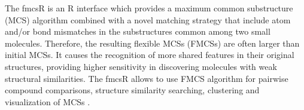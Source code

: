 The fmcsR is an R interface which provides a maximum common substructure (MCS) algorithm combined with a novel matching strategy that include atom and/or bond mismatches in the substructures common among two small molecules. Therefore, the resulting flexible MCSs (FMCSs) are often larger than initial MCSs. It causes the recognition of more shared features in their original structures, providing higher sensitivity in discovering molecules with weak structural similarities. The fmcsR allows to use FMCS algorithm for pairwise compound comparisons, structure similarity searching, clustering and visualization of MCSs \cite{Wang_2013}.